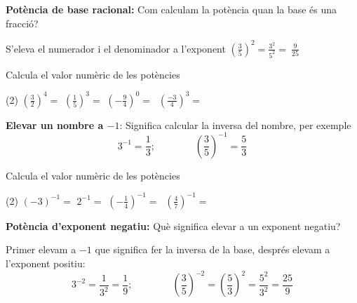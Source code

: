 \begin{example}
 \textbf{Potència de base racional: }Com calculam la potència quan la base és una fracció?

    S'eleva el numerador i el denominador a l'exponent ${\left(\frac{3}{5}\right)}^2=\frac{3^2}{5^2}=\ \frac{9}{25}$
\end{example}


\begin{mylist}
\exer \spen Calcula el valor numèric de les potències
\begin{tasks}(2)
\task  ${\left(\frac{3}{2}\right)}^4=$   \task ${\left(\frac{1}{5}\right)}^3=$  \task ${\left(-\frac{9}{4}\right)}^0=$  \task $\ {\left(\frac{-3}{4}\right)}^3=$
 \end{tasks}
\end{mylist}

\begin{theorybox}
 \textbf{Elevar un nombre a $-1$}: Significa calcular la inversa del nombre, per exemple
\[{\mathrm{3}}^{\mathrm{-}\mathrm{1}}\mathrm{=}\frac{\mathrm{1}}{\mathrm{3}};   \quad\quad\quad\quad  {\left(\frac{\mathrm{3}}{\mathrm{5}}\right)}^{\mathrm{-}\mathrm{1}}\mathrm{=}\frac{\mathrm{5}}{\mathrm{3}}\] 
\end{theorybox}

\begin{mylist}

\exer \spen Calcula el valor numèric de les potències
\begin{tasks}(2)
\task  ${\left(-3\right)}^{-1}=$   \task $2^{-1}=$   \task ${\left(-\frac{1}{4}\right)}^{-1}=$   \task $\ {\left(\frac{4}{7}\right)}^{-1}=$
\end{tasks}
\end{mylist}


\begin{theorybox}

 \textbf{Potència d'exponent negatiu: }Què significa elevar a un exponent negatiu?

 Primer elevam a $-1$ que significa fer la inversa de la base, després elevam a l'exponent positiu:
\[{\mathrm{3}}^{\mathrm{-}\mathrm{2}}\mathrm{=}\frac{\mathrm{1}}{{\mathrm{3}}^{\mathrm{2}}}=\frac{1}{9}     ; \quad\quad\quad\quad {\left(\frac{\mathrm{3}}{\mathrm{5}}\right)}^{\mathrm{-}\mathrm{2}}\mathrm{=}{\left(\frac{\mathrm{5}}{\mathrm{3}}\right)}^{\mathrm{2}}=\frac{5^2}{3^2}=\frac{25}{9}\] 

\end{theorybox}

